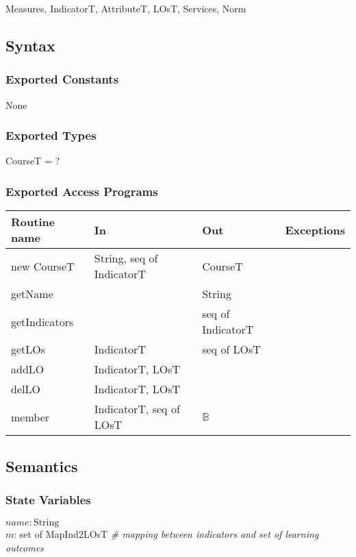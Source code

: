 \documentclass[12pt]{article}
\begin{document}
Measures, IndicatorT, AttributeT, LOsT, Services, Norm

\subsection* {Syntax}

\subsubsection* {Exported Constants}

None

\subsubsection* {Exported Types}

CourseT = ?

\subsubsection* {Exported Access Programs}

\begin{tabular}{| l | l | l | p{5cm} |}
  \hline
  \textbf{Routine name} & \textbf{In} & \textbf{Out} & \textbf{Exceptions}\\
  \hline
  new CourseT & String, seq of IndicatorT & CourseT & \\
  \hline
  getName & & String & ~\\
  \hline
  getIndicators & & seq of IndicatorT & ~\\
  \hline
  getLOs & IndicatorT & seq of LOsT & ~\\
  \hline
  addLO & IndicatorT, LOsT & & ~\\
  \hline
  delLO & IndicatorT, LOsT & & ~\\
  \hline
  member & IndicatorT, seq of LOsT & $\mathbb{B}$ & ~\\
  \hline
  
\end{tabular}

\subsection* {Semantics}

\subsubsection* {State Variables}

$\mathit{name}: \text{String}$\\
$m$: set of MapInd2LOsT \textit{\# mapping between indicators and set of learning outcomes}
\end{document}
